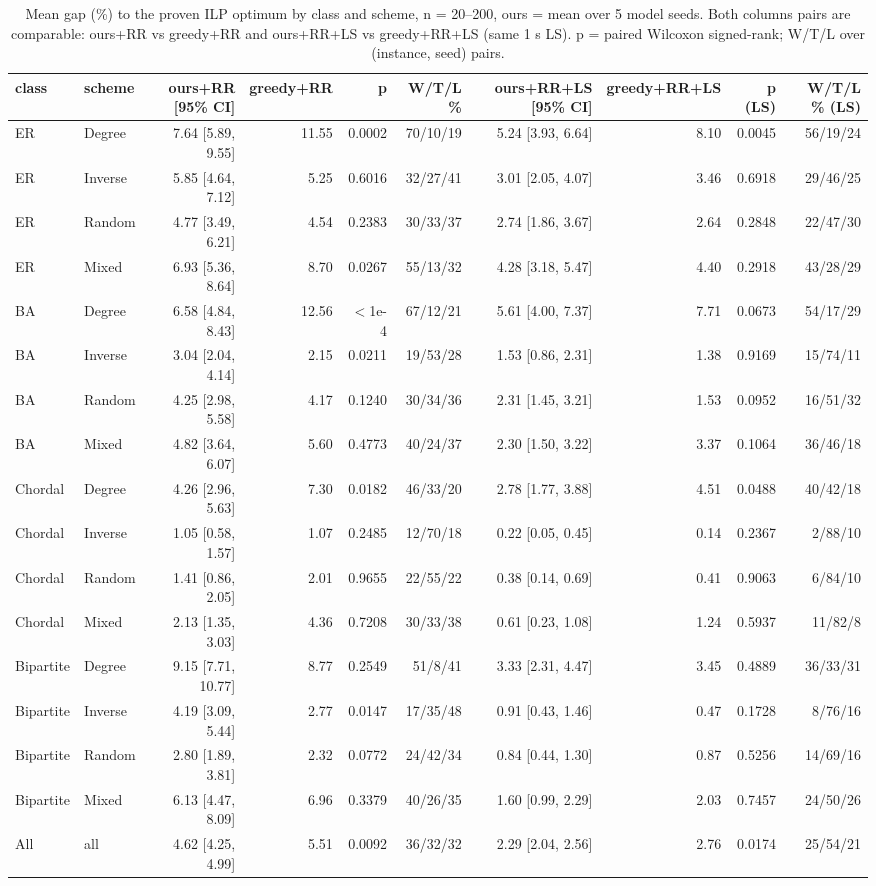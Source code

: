 \begin{table}[t]
\centering
\caption{Mean gap (\%) to the proven ILP optimum by class and scheme, n = 20--200, ours = mean over 5 model seeds. Both columns pairs are comparable: ours+RR vs greedy+RR and ours+RR+LS vs greedy+RR+LS (same 1 s LS). p = paired Wilcoxon signed-rank; W/T/L over (instance, seed) pairs.}
\label{tab:table3_fair}
\scriptsize
\begin{tabular}{llrrrrrrrr}
\toprule
class & scheme & ours+RR [95\% CI] & greedy+RR & p & W/T/L \% & ours+RR+LS [95\% CI] & greedy+RR+LS & p (LS) & W/T/L \% (LS) \\
\midrule
ER & Degree & 7.64 [5.89, 9.55] & 11.55 & 0.0002 & 70/10/19 & 5.24 [3.93, 6.64] & 8.10 & 0.0045 & 56/19/24 \\
ER & Inverse & 5.85 [4.64, 7.12] & 5.25 & 0.6016 & 32/27/41 & 3.01 [2.05, 4.07] & 3.46 & 0.6918 & 29/46/25 \\
ER & Random & 4.77 [3.49, 6.21] & 4.54 & 0.2383 & 30/33/37 & 2.74 [1.86, 3.67] & 2.64 & 0.2848 & 22/47/30 \\
ER & Mixed & 6.93 [5.36, 8.64] & 8.70 & 0.0267 & 55/13/32 & 4.28 [3.18, 5.47] & 4.40 & 0.2918 & 43/28/29 \\
BA & Degree & 6.58 [4.84, 8.43] & 12.56 & $<$1e-4 & 67/12/21 & 5.61 [4.00, 7.37] & 7.71 & 0.0673 & 54/17/29 \\
BA & Inverse & 3.04 [2.04, 4.14] & 2.15 & 0.0211 & 19/53/28 & 1.53 [0.86, 2.31] & 1.38 & 0.9169 & 15/74/11 \\
BA & Random & 4.25 [2.98, 5.58] & 4.17 & 0.1240 & 30/34/36 & 2.31 [1.45, 3.21] & 1.53 & 0.0952 & 16/51/32 \\
BA & Mixed & 4.82 [3.64, 6.07] & 5.60 & 0.4773 & 40/24/37 & 2.30 [1.50, 3.22] & 3.37 & 0.1064 & 36/46/18 \\
Chordal & Degree & 4.26 [2.96, 5.63] & 7.30 & 0.0182 & 46/33/20 & 2.78 [1.77, 3.88] & 4.51 & 0.0488 & 40/42/18 \\
Chordal & Inverse & 1.05 [0.58, 1.57] & 1.07 & 0.2485 & 12/70/18 & 0.22 [0.05, 0.45] & 0.14 & 0.2367 & 2/88/10 \\
Chordal & Random & 1.41 [0.86, 2.05] & 2.01 & 0.9655 & 22/55/22 & 0.38 [0.14, 0.69] & 0.41 & 0.9063 & 6/84/10 \\
Chordal & Mixed & 2.13 [1.35, 3.03] & 4.36 & 0.7208 & 30/33/38 & 0.61 [0.23, 1.08] & 1.24 & 0.5937 & 11/82/8 \\
Bipartite & Degree & 9.15 [7.71, 10.77] & 8.77 & 0.2549 & 51/8/41 & 3.33 [2.31, 4.47] & 3.45 & 0.4889 & 36/33/31 \\
Bipartite & Inverse & 4.19 [3.09, 5.44] & 2.77 & 0.0147 & 17/35/48 & 0.91 [0.43, 1.46] & 0.47 & 0.1728 & 8/76/16 \\
Bipartite & Random & 2.80 [1.89, 3.81] & 2.32 & 0.0772 & 24/42/34 & 0.84 [0.44, 1.30] & 0.87 & 0.5256 & 14/69/16 \\
Bipartite & Mixed & 6.13 [4.47, 8.09] & 6.96 & 0.3379 & 40/26/35 & 1.60 [0.99, 2.29] & 2.03 & 0.7457 & 24/50/26 \\
All & all & 4.62 [4.25, 4.99] & 5.51 & 0.0092 & 36/32/32 & 2.29 [2.04, 2.56] & 2.76 & 0.0174 & 25/54/21 \\
\bottomrule
\end{tabular}
\end{table}
